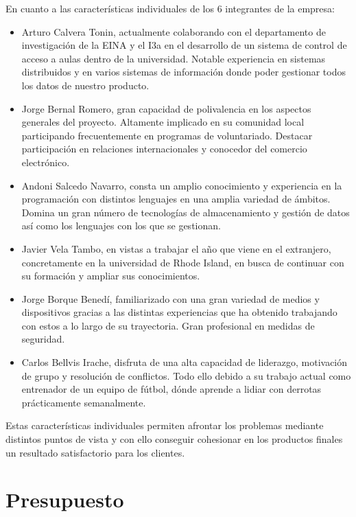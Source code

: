 \documentclass{article}
\begin{document}
En cuanto a las características individuales de los 6 integrantes de la empresa:
\begin{itemize}
   \item Arturo Calvera Tonin, actualmente colaborando con el departamento de investigación de la EINA y el I3a en el desarrollo de un sistema de control de acceso a aulas dentro de la universidad. Notable experiencia en sistemas distribuidos y en varios sistemas de información donde poder gestionar todos los datos de nuestro producto.
   \item Jorge Bernal Romero, gran capacidad de polivalencia en los aspectos generales del proyecto. Altamente implicado en su comunidad local participando frecuentemente en programas de voluntariado. Destacar participación en relaciones internacionales y conocedor del comercio electrónico.
   \item Andoni Salcedo Navarro, consta un amplio conocimiento y experiencia en la programación con distintos lenguajes en una amplia variedad de ámbitos. Domina un gran número de tecnologías de almacenamiento y gestión de datos así como los lenguajes con los que se gestionan.
   \item Javier Vela Tambo, en vistas a trabajar el año que viene en el extranjero, concretamente en la universidad de Rhode Island, en busca de continuar con su formación y ampliar sus conocimientos.
   \item Jorge Borque Benedí, familiarizado con una gran variedad de medios y dispositivos gracias a las distintas experiencias que ha obtenido trabajando con estos a lo largo de su trayectoria. Gran profesional en medidas de seguridad.
   \item Carlos Bellvis Irache, disfruta de una alta capacidad de liderazgo, motivación de grupo y resolución de conflictos. Todo ello debido a su trabajo actual como entrenador de un equipo de fútbol, dónde aprende a lidiar con derrotas prácticamente semanalmente.
\end{itemize}


Estas características individuales permiten afrontar los problemas mediante distintos puntos de vista y con ello conseguir cohesionar en los productos finales un resultado satisfactorio para los clientes.

\pagebreak

\section{Presupuesto}
\end{document}
